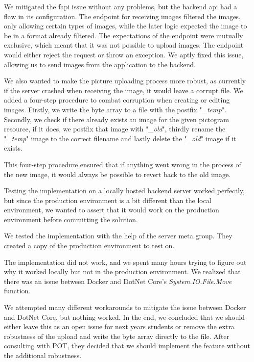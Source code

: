 We mitigated the \gls{fapi} issue without any problems, but the backend \gls{api} had a flaw in its configuration. The endpoint for receiving images filtered the images, only allowing certain types of images, while the later logic expected the image to be in a format already filtered. The expectations of the endpoint were mutually exclusive, which meant that it was not possible to upload images. The endpoint would either reject the request or throw an exception. We aptly fixed this issue, allowing us to send images from the application to the backend.

We also wanted to make the picture uploading process more robust, as currently if the server crashed when receiving the image, it would leave a corrupt file. We added a four-step procedure to combat corruption when creating or editing images. Firstly, we write the byte array to a file with the postfix "\textit{\_temp}". Secondly, we check if there already exists an image for the given pictogram resource, if it does, we postfix that image with "\textit{\_old}", thirdly rename the "\textit{\_temp}" image to the correct filename and lastly delete the "\textit{\_old}" image if it exists.

This four-step procedure ensured that if anything went wrong in the process of the new image, it would always be possible to revert back to the old image.

Testing the implementation on a locally hosted backend server worked perfectly, but since the production environment is a bit different than the local environment, we wanted to assert that it would work on the production environment before committing the solution.

We tested the implementation with the help of the server meta group. They created a copy of the production environment to test on. 

The implementation did not work, and we spent many hours trying to figure out why it worked locally but not in the production environment. We realized that there was an issue between Docker and DotNet Core's \textit{System.IO.File.Move} function. 

We attempted many different workarounds to mitigate the issue between Docker and DotNet Core, but nothing worked. In the end, we concluded that we should either leave this as an open issue for next years students or remove the extra robustness of the upload and write the byte array directly to the file. After consulting with \gls{POT}, they decided that we should implement the feature without the additional robustness.

